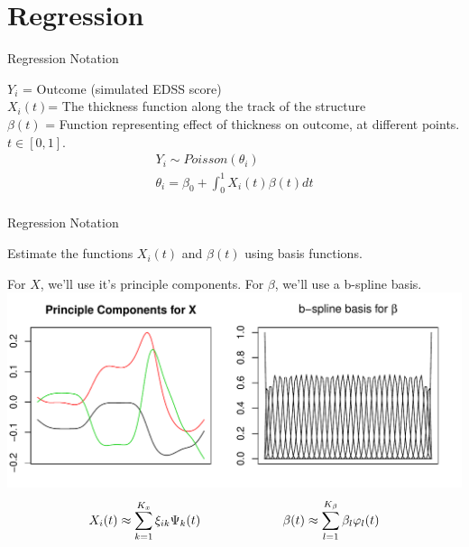 \documentclass[9 pt]{beamer}
\newcommand{\es}[1]{\begin{equation*}\begin{split} #1 \end{split} \end{equation*}}
\begin{document}
\begin{frame}
\begin{figure}[ht]
\begin{minipage}[b]{0.45\linewidth}
\end{minipage}
\end{figure}
\end{frame}


\section*{Regression}
\begin{frame}{Regression Notation}

$Y_i$ = Outcome (simulated EDSS score) \\
$X_i(t)$= The thickness function along the track of the structure \\
$\beta(t)$ = Function representing effect of thickness on outcome, at different points.\\
$t \in [0,1]$.\\

\es{
Y_i \sim Poisson(\theta_i)\\
\theta_i =\beta_0 + \int_0^1 X_i(t)\beta(t) dt \\
}

\end{frame}



\begin{frame}{Regression Notation}

Estimate the functions $X_i(t)$ and $\beta(t)$ using basis functions.\

For $X$, we'll use it's principle components. For $\beta$, we'll use a b-spline basis.
\includegraphics[scale=.5]{pics/Figure_Basis.pdf}
\es{
X_i(t) \approx \sum_{k=1}^{K_x} \xi_{ik} \Psi_k(t) \hspace{2.3cm} \beta(t) \approx \sum_{l=1}^{K_\beta} \beta_l \varphi_l(t) 
}
\end{frame}
\end{document}

